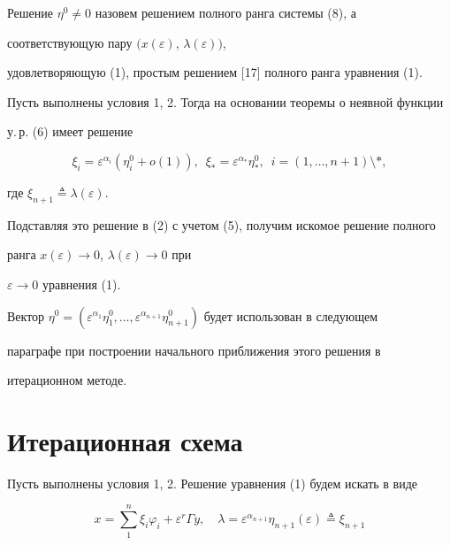 \medskip





Решение $\eta^0 \ne 0$ назовем решением полного ранга системы (8), а


соответствующую пару $(x(\varepsilon)$, $\lambda(\varepsilon))$,


удовлетворяющую (1), простым решением [17] полного ранга уравнения (1).





Пусть выполнены условия 1, 2. Тогда на основании теоремы о неявной функции


у.\,р. (6) имеет решение


$$


\xi_i = \varepsilon^{\alpha_i}(\eta^0_i + o(1)),\ \; \xi_* =


\varepsilon^{\alpha_*}\eta^0_*,\ \; i=(1,\dotsc,n+1)\setminus *,


$$


где $\xi_{n+1}\triangleq \lambda(\varepsilon)$.


Подставляя это решение в (2) с учетом (5), получим искомое решение полного


ранга $x(\varepsilon)\rightarrow 0$, $\lambda(\varepsilon)\rightarrow 0$ при


$\varepsilon \rightarrow 0$ уравнения (1).





Вектор $\eta^0 = (\varepsilon^{\alpha_1}\eta^0_1,\dotsc,


\varepsilon^{\alpha_{n+1}}\eta^0_{n+1})$ будет использован в следующем


параграфе при построении начального приближения этого решения в


итерационном методе.





\section{Итерационная схема}





Пусть выполнены условия 1, 2. Решение уравнения (1) будем искать в виде


\begin{equation}


x = \sum_1^n\xi_i\varphi_i + \varepsilon^r\Gamma y, \quad \lambda =


\varepsilon^{\alpha_{n+1}}\eta_{n+1}(\varepsilon)


\triangleq \xi_{n+1}


\end{equation}


